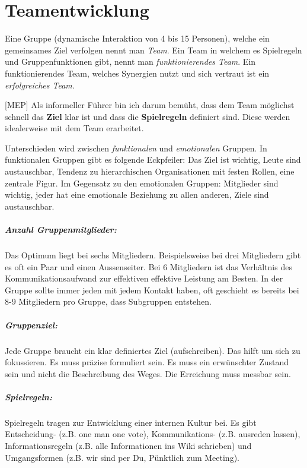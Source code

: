 \chapter{Teamentwicklung}

Eine Gruppe (dynamische Interaktion von 4 bis 15 Personen), welche ein gemeinsames Ziel verfolgen nennt man \textit{Team}. Ein Team in welchem es Spielregeln und Gruppenfunktionen gibt, nennt man \textit{funktionierendes Team}. Ein funktionierendes Team, welches Synergien nutzt und sich vertraut ist ein \textit{erfolgreiches Team}.

[MEP] Als informeller Führer bin ich darum bemüht, dass dem Team möglichst schnell das \textbf{Ziel} klar ist und dass die \textbf{Spielregeln} definiert sind. Diese werden idealerweise mit dem Team erarbeitet.

Unterschieden wird zwischen \textit{funktionalen} und \textit{emotionalen} Gruppen. In funktionalen Gruppen gibt es folgende Eckpfeiler: Das Ziel ist wichtig, Leute sind austauschbar, Tendenz zu hierarchischen Organisationen mit festen Rollen, eine zentrale Figur. Im Gegensatz zu den emotionalen Gruppen: Mitglieder sind wichtig, jeder hat eine emotionale Beziehung zu allen anderen, Ziele sind austauschbar.

\paragraph{Anzahl Gruppenmitglieder:} Das Optimum liegt bei sechs Mitgliedern. Beispielsweise bei drei Mitgliedern gibt es oft ein Paar und einen Aussenseiter. Bei 6 Mitgliedern ist das Verhältnis des Kommunikationsaufwand zur effektiven effektive Leistung am Besten. In der Gruppe sollte immer jeden mit jedem Kontakt haben, oft geschieht es bereits bei 8-9 Mitgliedern pro Gruppe, dass Subgruppen entstehen.

\paragraph{Gruppenziel:} Jede Gruppe braucht ein klar definiertes Ziel (aufschreiben). Das hilft um sich zu fokussieren. Es muss präzise formuliert sein. Es muss ein erwünschter Zustand sein und nicht die Beschreibung des Weges. Die Erreichung muss messbar sein.

\paragraph{Spielregeln:} Spielregeln tragen zur Entwicklung einer internen Kultur bei. Es gibt Entscheidung- (z.B. one man one vote), Kommunikations- (z.B. ausreden lassen), Informationsregeln (z.B. alle Informationen ins Wiki schrieben) und Umgangsformen (z.B. wir sind per Du, Pünktlich zum Meeting).

